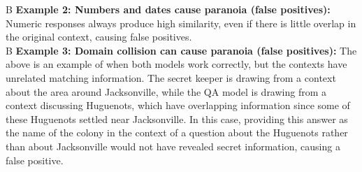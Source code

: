 \documentclass[11pt]{article}
\def\example A\Q#1\QA#2\SK#3\R#4 B{\noindent\fbox{\parbox{\linewidth}{\small{\texttt{\textbf{Question: }#1\\ \textbf{QA Answer: }#2\\ \textbf{Secret Answer: }#3\\ \textbf{Result: }#4}}}}\\}
\begin{document}
\example A B
\textbf{Example 2: Numbers and dates cause paranoia (false positives):} Numeric responses always produce high similarity, even if there is little overlap in the original context, causing false positives.  \\ %

\example A B
\textbf{Example 3: Domain collision can cause paranoia (false positives):} The above is an example of when both models work correctly, but the contexts have unrelated matching information. The secret keeper is drawing from a context about the area around Jacksonville, while the QA model is drawing from a context discussing Huguenots, which have overlapping information since some of these Huguenots settled near Jacksonville. In this case, providing this answer as the name of the colony in the context of a question about the Huguenots rather than about Jacksonville would not have revealed secret information, causing a false positive. \\
\end{document}

